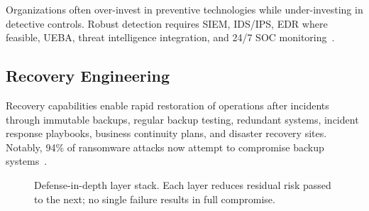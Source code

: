 \documentclass[sigconf,nonacm]{acmart}
\begin{document}
Organizations often over-invest in preventive technologies while under-investing in
detective controls. Robust detection requires SIEM, IDS/IPS, EDR where feasible, UEBA,
threat intelligence integration, and 24/7 SOC monitoring~\cite{guidehouse2023}.

\subsection{Recovery Engineering}

Recovery capabilities enable rapid restoration of operations after incidents through
immutable backups, regular backup testing, redundant systems, incident response
playbooks, business continuity plans, and disaster recovery sites. Notably, 94\% of
ransomware attacks now attempt to compromise backup systems~\cite{networkcomputing2024}.

\begin{figure}[h]
\centering
{}
\caption{Defense-in-depth layer stack. Each layer reduces residual risk passed to the
  next; no single failure results in full compromise.}
\label{fig:did}
\end{figure}
\end{document}

